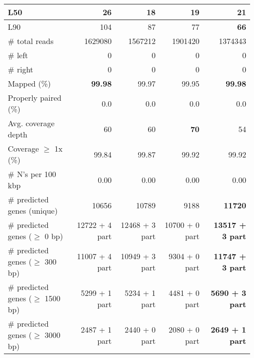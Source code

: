 \documentclass[12pt,a4paper]{article}
\begin{document}
\begin{table}[ht]
\begin{center}
\begin{tabular}{|l*{4}{|r}|}
L50 & 26 & {\bf 18} & 19 & 21 \\ \hline
L90 & 104 & 87 & 77 & {\bf 66} \\ \hline
\# total reads & 1629080 & 1567212 & 1901420 & 1374343 \\ \hline
\# left & 0 & 0 & 0 & 0 \\ \hline
\# right & 0 & 0 & 0 & 0 \\ \hline
Mapped (\%) & {\bf 99.98} & 99.97 & 99.95 & {\bf 99.98} \\ \hline
Properly paired (\%) & 0.0 & 0.0 & 0.0 & 0.0 \\ \hline
Avg. coverage depth & 60 & 60 & {\bf 70} & 54 \\ \hline
Coverage $\geq$ 1x (\%) & 99.84 & 99.87 & 99.92 & 99.92 \\ \hline
\# N's per 100 kbp & 0.00 & 0.00 & 0.00 & 0.00 \\ \hline
\# predicted genes (unique) & 10656 & 10789 & 9188 & {\bf 11720} \\ \hline
\# predicted genes ($\geq$ 0 bp) & 12722 + 4 part & 12468 + 3 part & 10700 + 0 part & {\bf 13517 + 3 part} \\ \hline
\# predicted genes ($\geq$ 300 bp) & 11007 + 4 part & 10949 + 3 part & 9304 + 0 part & {\bf 11747 + 3 part} \\ \hline
\# predicted genes ($\geq$ 1500 bp) & 5299 + 1 part & 5234 + 1 part & 4481 + 0 part & {\bf 5690 + 3 part} \\ \hline
\# predicted genes ($\geq$ 3000 bp) & 2487 + 1 part & 2440 + 0 part & 2080 + 0 part & {\bf 2649 + 1 part} \\ \hline
\end{tabular}
\end{center}
\end{table}
\end{document}
